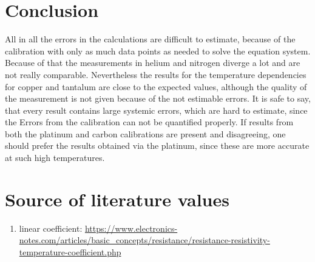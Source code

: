 \documentclass{article}
\begin{document}
\section{Conclusion}
All in all the errors in the calculations are difficult to estimate, because of the calibration with only as much data points as needed to solve the equation system.
Because of that the measurements in helium and nitrogen diverge a lot and are not really comparable.
Nevertheless the results for the temperature dependencies for copper and tantalum are close to the expected values, although the quality of the measurement is not given because of the not estimable errors.
It is safe to say, that every result contains large systemic errors, which are hard to estimate, since the Errors from the calibration can not be quantified properly.
If results from both the platinum and carbon calibrations are present and disagreeing, one should prefer the results obtained via the platinum, since these are more accurate at such high temperatures.
\newpage

\section{Source of literature values}
\begin{enumerate}
    \item linear coefficient: \url{https://www.electronics-notes.com/articles/basic_concepts/resistance/resistance-resistivity-temperature-coefficient.php}
\end{enumerate}
    
\end{document}
